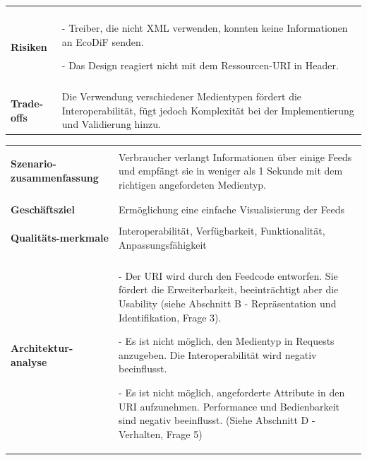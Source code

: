 \documentclass{acmsiggraph}
\begin{document}
\begin{center}
\begin{xtabular}{|C{2,5cm}|L{5,5cm}|}
     \hline 
     & \\[-2ex]
   \textbf{Risiken} & 
\item[-] Treiber, die nicht XML verwenden, konnten keine Informationen an EcoDiF senden.
\item[-] Das Design reagiert nicht mit dem Ressourcen-URI in Header.
 \\ 
       \hline 
      & \\[-2ex]
     \textbf{Trade-offs} & 
     Die Verwendung verschiedener Medientypen fördert die Interoperabilität, fügt jedoch Komplexität bei der Implementierung und Validierung hinzu.
\\    
\hline 
 \end{xtabular}
 \end{center}
\vspace{4px}
\begin{center}
  \label{tab:xtab}
  \begin{xtabular}{|C{2,5cm}|L{5,5cm}|} 
  \hline
  & \\[-2ex]
    \textbf{Szenario-zusammenfassung} & Verbraucher verlangt Informationen über einige Feeds und empfängt sie in weniger als 1 Sekunde mit dem richtigen angefordeten Medientyp. \\
    & \\[-2ex]
  \hline
  & \\[-2ex]
    \textbf{Geschäftsziel} & Ermöglichung eine einfache Visualisierung der Feeds \\
    \hline
    & \\[-2ex]
   \textbf{ Qualitäts-merkmale } & Interoperabilität, Verfügbarkeit, Funktionalität,
Anpassungsfähigkeit
 \\ 
     \hline
       & \\[-2ex]
    \textbf{Architektur-analyse} & 
    \item[-] Der URI wird durch den Feedcode entworfen. Sie fördert die Erweiterbarkeit, beeinträchtigt aber die Usability (siehe Abschnitt B - Repräsentation und Identifikation, Frage 3).
    \item[-] Es ist nicht möglich, den Medientyp in Requests anzugeben. Die Interoperabilität wird negativ beeinflusst.
    \item[-] Es ist nicht möglich, angeforderte Attribute in den URI aufzunehmen. Performance und Bedienbarkeit sind negativ beeinflusst.
(Siehe Abschnitt D - Verhalten, Frage 5)


\end{xtabular}
\end{center}
\end{document}
